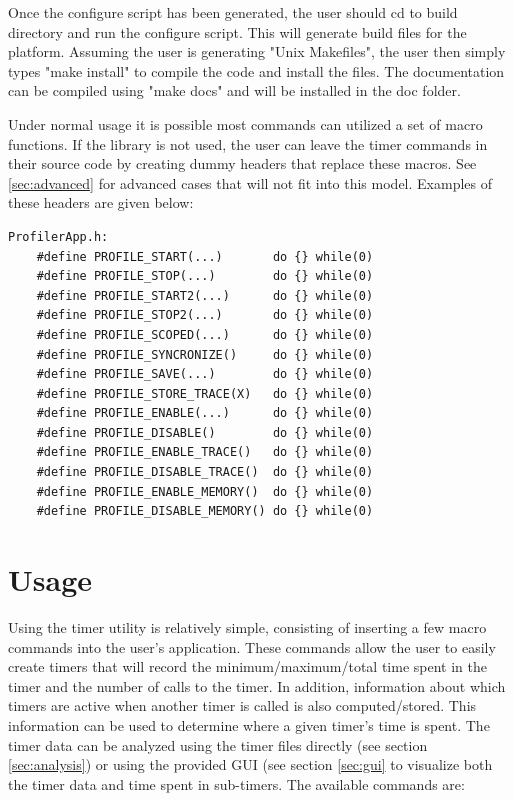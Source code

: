 \documentclass[fleqn,10pt,letterpaper]{article}
\begin{document}
Once the configure script has been generated, the user should cd to build directory
and run the configure script.  This will generate build files for the platform.
Assuming the user is generating "Unix Makefiles", the user then simply types 
"make install" to compile the code and install the files.  The documentation
can be compiled using "make docs" and will be installed in the doc folder.  

Under normal usage it is possible most commands can utilized a set of macro 
functions.  If the library is not used, the user can leave the timer commands in
their source code by creating dummy headers that replace these macros.
See \ref{sec:advanced} for advanced cases that will not fit into this model.
Examples of these headers are given below: 
\begin{Verbatim}[baselinestretch=1.0]
ProfilerApp.h:
    #define PROFILE_START(...)       do {} while(0)
    #define PROFILE_STOP(...)        do {} while(0)
    #define PROFILE_START2(...)      do {} while(0)
    #define PROFILE_STOP2(...)       do {} while(0)
    #define PROFILE_SCOPED(...)      do {} while(0)
    #define PROFILE_SYNCRONIZE()     do {} while(0)
    #define PROFILE_SAVE(...)        do {} while(0)
    #define PROFILE_STORE_TRACE(X)   do {} while(0)
    #define PROFILE_ENABLE(...)      do {} while(0)
    #define PROFILE_DISABLE()        do {} while(0)
    #define PROFILE_ENABLE_TRACE()   do {} while(0)
    #define PROFILE_DISABLE_TRACE()  do {} while(0)
    #define PROFILE_ENABLE_MEMORY()  do {} while(0)
    #define PROFILE_DISABLE_MEMORY() do {} while(0)
\end{Verbatim}



\section{Usage}  \label{sec:usage}

Using the timer utility is relatively simple, consisting of inserting a few macro
commands into the user's application.  These commands allow the user to easily create
timers that will record the minimum/maximum/total time spent in the timer and the
number of calls to the timer.  In addition, information about which timers are 
active when another timer is called is also computed/stored.  This information
can be used to determine where a given timer's time is spent.  The timer data can be 
analyzed using the timer files directly (see section \ref{sec:analysis}) or using 
the provided GUI (see section \ref{sec:gui} to visualize both the timer data and 
time spent in sub-timers.  
The available commands are: \\
\end{document}
